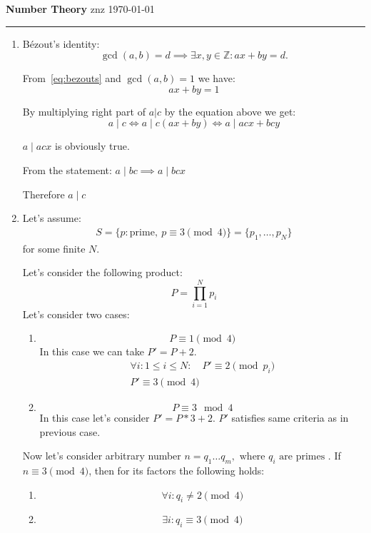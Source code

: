 \documentclass[12pt]{article}
\begin{document}
\noindent
{\large\bfseries Number Theory}
\hfill
znz
\quad
\today

\hrule
\medskip

\begin{enumerate}
 \item
        Bézout's identity:
        \begin{equation}
          \gcd(a, b)=d \implies \exists x, y \in \mathbb{Z} : ax+by=d.
          \label{eq:bezouts}
        \end{equation}

        From~\eqref{eq:bezouts} and $\gcd(a,b)=1$ we have:
        \[
        ax+by=1
        \]

        By multiplying right part of $a|c$ by the equation above we get:
        \[
        a \mid c \iff a \mid c(ax+by) \iff a \mid acx + bcy
        \]

        $a \mid acx$ is obviously true.

        From the statement: $a \mid bc \implies a \mid bcx$

        Therefore $a \mid c$
  \item
        Let's assume:
        \[
        \begin{gathered}
        S=\{p:\text{prime}, \ p \equiv 3 \pmod4\}=\{p_1,\dots,p_N\}
        \end{gathered}
        \]
        for some finite $N$.

        Let's consider the following product:
        \[
        P = \prod_{i=1}^{N} p_{i}
        \]
        Let's consider two cases:
        \begin{enumerate}
          \item
                \[
                P \equiv 1 \pmod{4}
                \]
                In this case we can take $P' = P + 2$.
                \[
                \begin{gathered}
                \forall i: 1 \leq i \leq N:\quad P' \equiv 2 \pmod{p_{i}} \\
                P' \equiv 3 \pmod{4}
                \end{gathered}
                \]
          \item
                \[
                P \equiv 3 \mod{4}
                \]
                In this case let's consider $P' = P * 3 + 2$. $P'$ satisfies same criteria as in previous case.
        \end{enumerate}

        Now let's consider arbitrary number $n=q_{1} \ldots q_{m}, \text{ where } q_{i} \text{ are primes }$. If $n \equiv 3 \pmod{4}$, then for its factors the following holds:
        \begin{enumerate}
          \item
                \[
                \forall i: q_{i} \neq 2 \pmod{4}
                \]
          \item
                \[
                \exists i: q_{i} \equiv 3 \pmod{4}
                \]
        \end{enumerate}


\end{enumerate}
\end{document}
